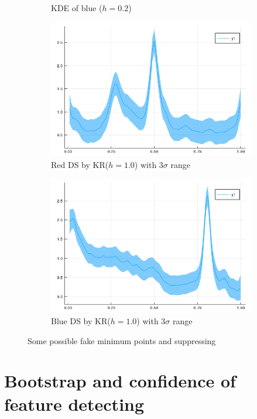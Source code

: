 \documentclass{article}
\begin{document}
\begin{figure}[htb]
\begin{subfigure}[b]{0.49\linewidth}
    \caption{KDE of blue ($h=0.2$)}
  \end{subfigure}
  \begin{subfigure}[b]{0.49\linewidth}
    \includegraphics[width=\linewidth]{images/kde_reg_r.png}
    \caption{Red DS by KR($h=1.0$) with 3$\sigma$ range}
  \end{subfigure}
  \begin{subfigure}[b]{0.49\linewidth}
    \includegraphics[width=\linewidth]{images/kde_reg_b.png}
    \caption{Blue DS by KR($h=1.0$) with 3$\sigma$ range}
  \end{subfigure}
  \caption{Some possible fake minimum points and suppressing}
  \label{fig:DS_REG}
\end{figure}


\section{Bootstrap and confidence of feature detecting}
\end{document}
